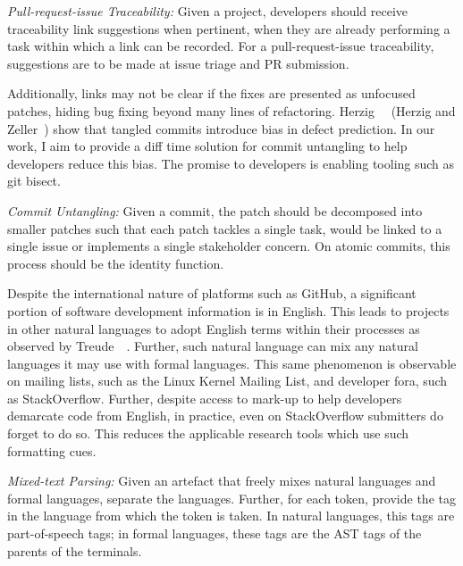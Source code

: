 \begin{tcolorbox}
    \emph{Pull-request-issue Traceability:} Given a project, developers should
    receive traceability link suggestions when pertinent, \ie when they are
    already performing a task within which a link can be recorded. For a
    pull-request-issue traceability, suggestions are to be made at issue triage
    and PR submission.
\end{tcolorbox}

Additionally, links may not be clear if the fixes are presented as unfocused
patches, hiding bug fixing beyond many lines of refactoring.
Herzig~\etal~\cite{Herzig2016} (Herzig and Zeller~\cite{Herzig2013}) show that
tangled commits introduce bias in defect prediction. In our work, I aim to
provide a diff time solution for commit untangling to help developers reduce
this bias. The promise to developers is enabling tooling such as git bisect.

\begin{tcolorbox}
    \emph{Commit Untangling:} Given a commit, the patch should be decomposed
    into smaller patches such that each patch tackles a single task, \ie would
    be linked to a single issue or implements a single stakeholder concern. On
    atomic commits, this process should be the identity function.
\end{tcolorbox}

Despite the international nature of platforms such as GitHub, a significant
portion of software development information is in English. This leads to
projects in other natural languages to adopt English terms within their
processes as observed by Treude~\etal~\cite{Treude2015portuguese}. Further, such
natural language can mix any natural languages it may use with formal languages.
This same phenomenon is observable on mailing lists, such as the Linux Kernel
Mailing List, and developer fora, such as StackOverflow.  Further, despite
access to mark-up to help developers demarcate code from English, in practice,
even on StackOverflow submitters do forget to do so. This reduces the applicable
research tools which use such formatting cues.

\begin{tcolorbox}
    \emph{Mixed-text Parsing:} Given an artefact that freely
    mixes natural languages and formal languages, separate the languages.
    Further, for each token, provide the tag in the language from which the
    token is taken. In natural languages, this tags are part-of-speech tags; in
    formal languages, these tags are the AST tags of the parents of the
    terminals.
\end{tcolorbox}

